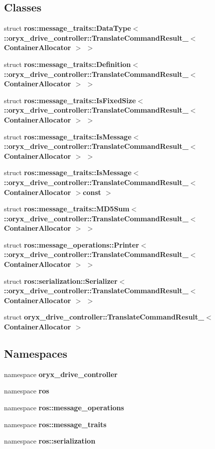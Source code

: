 \subsection*{\-Classes}
\begin{DoxyCompactItemize}
\item 
struct {\bf ros\-::message\-\_\-traits\-::\-Data\-Type$<$ \-::oryx\-\_\-drive\-\_\-controller\-::\-Translate\-Command\-Result\-\_\-$<$ Container\-Allocator $>$ $>$}
\item 
struct {\bf ros\-::message\-\_\-traits\-::\-Definition$<$ \-::oryx\-\_\-drive\-\_\-controller\-::\-Translate\-Command\-Result\-\_\-$<$ Container\-Allocator $>$ $>$}
\item 
struct {\bf ros\-::message\-\_\-traits\-::\-Is\-Fixed\-Size$<$ \-::oryx\-\_\-drive\-\_\-controller\-::\-Translate\-Command\-Result\-\_\-$<$ Container\-Allocator $>$ $>$}
\item 
struct {\bf ros\-::message\-\_\-traits\-::\-Is\-Message$<$ \-::oryx\-\_\-drive\-\_\-controller\-::\-Translate\-Command\-Result\-\_\-$<$ Container\-Allocator $>$ $>$}
\item 
struct {\bf ros\-::message\-\_\-traits\-::\-Is\-Message$<$ \-::oryx\-\_\-drive\-\_\-controller\-::\-Translate\-Command\-Result\-\_\-$<$ Container\-Allocator $>$const  $>$}
\item 
struct {\bf ros\-::message\-\_\-traits\-::\-M\-D5\-Sum$<$ \-::oryx\-\_\-drive\-\_\-controller\-::\-Translate\-Command\-Result\-\_\-$<$ Container\-Allocator $>$ $>$}
\item 
struct {\bf ros\-::message\-\_\-operations\-::\-Printer$<$ \-::oryx\-\_\-drive\-\_\-controller\-::\-Translate\-Command\-Result\-\_\-$<$ Container\-Allocator $>$ $>$}
\item 
struct {\bf ros\-::serialization\-::\-Serializer$<$ \-::oryx\-\_\-drive\-\_\-controller\-::\-Translate\-Command\-Result\-\_\-$<$ Container\-Allocator $>$ $>$}
\item 
struct {\bf oryx\-\_\-drive\-\_\-controller\-::\-Translate\-Command\-Result\-\_\-$<$ Container\-Allocator $>$}
\end{DoxyCompactItemize}
\subsection*{\-Namespaces}
\begin{DoxyCompactItemize}
\item 
namespace {\bf oryx\-\_\-drive\-\_\-controller}
\item 
namespace {\bf ros}
\item 
namespace {\bf ros\-::message\-\_\-operations}
\item 
namespace {\bf ros\-::message\-\_\-traits}
\item 
namespace {\bf ros\-::serialization}
\end{DoxyCompactItemize}
